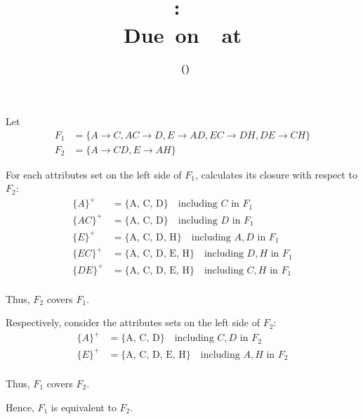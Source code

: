 \documentclass[11pt,letterpaper,titlepage,en-US]{article}
\title{
    \vspace{2in}
    \textmd{\textbf{\hmwkClassName \\\hmwkClass:\ \hmwkTitle}}\\
    \normalsize\vspace{0.1in}\small{Due\ on\ \DTMusedate{DueDate}\ at \DTMusetime{DueDate} }\\
    \vspace{0.1in}\large{\textit{\hmwkClassInstructor}}
    \vspace{3in}
}
\author{\textbf{\hmwkAuthorName\ \footnotesize{(\hmwkAuthorNetID)}} \\ \hmwkAuthorUTDEmail}
\date{}
\begin{document}
\maketitle


\pagebreak

\begin{homeworkProblem}
Let
\begin{align*}
    F_1 &= \{A \rightarrow C, AC \rightarrow D, E \rightarrow AD, EC \rightarrow DH, DE \rightarrow CH\} \\
    F_2 &= \{A \rightarrow CD, E \rightarrow AH\}
\end{align*}

For each attributes set on the left side of $F_1$, calculates its closure with respect to $F_2$:
\begin{align*}
    \{A\}^+ &= \{\text{A, C, D}\} \quad \text{including $C$ in $F_1$}\\
    \{AC\}^+ &= \{\text{A, C, D}\} \quad \text{including $D$ in $F_1$}\\
    \{E\}^+ &= \{\text{A, C, D, H}\} \quad \text{including $A, D$ in $F_1$}\\
    \{EC\}^+ &= \{\text{A, C, D, E, H}\} \quad \text{including $D, H$ in $F_1$}\\
    \{DE\}^+ &= \{\text{A, C, D, E, H}\} \quad \text{including $C, H$ in $F_1$}\\
\end{align*}

Thus, $F_2$ covers $F_1$.

Respectively, consider the attributes sets on the left side of $F_2$:
\begin{align*}
    \{A\}^+ &= \{\text{A, C, D}\} \quad \text{including $C, D$ in $F_2$} \\
    \{E\}^+ &= \{\text{A, C, D, E, H}\} \quad \text{including $A, H$ in $F_2$} \\
\end{align*}

Thus, $F_1$ covers $F_2$.

Hence, $F_1$ is equivalent to $F_2$.

\end{homeworkProblem}
\pagebreak
\end{document}
